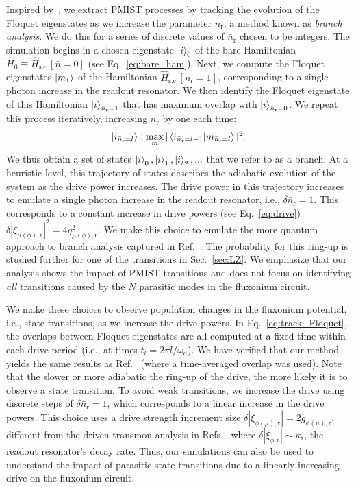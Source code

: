 \documentclass[%
reprint,
superscriptaddress,
 amsmath,amssymb,
 aps,
 prx,
longbibliography,
floatfix,
]{revtex4-2}
\begin{document}
Inspired by~\cite{dumas2024unified,cohen2023reminiscence}, we extract PMIST processes by tracking the evolution of the Floquet eigenstates as we increase the parameter $\bar{n}_\textrm{r}$, a method known as \emph{branch analysis}. We do this for a series of discrete values of $\bar{n}_\textrm{r}$ chosen to be integers. The simulation begins in a chosen eigenstate $\ket{i}_0$ of the bare Hamiltonian $\hat{H}_0 \equiv \hat{H}_\textrm{s.c.}[\bar{n}=0]$ (see Eq.~\ref{eq:bare_ham}). Next, we compute the Floquet eigenstates $\ket{m_1}$ of the Hamiltonian $\hat{H}_\textrm{s.c.}[\bar{n}_\textrm{r}=1]$, corresponding to a single photon increase in the readout resonator. We then identify the Floquet eigenstate of this Hamiltonian $\ket{i}_{\bar n_\textrm{r}=1}$ that has maximum overlap with $\ket{i}_{\bar n_\textrm{r}=0}$. We repeat this process iteratively, increasing $\bar{n}_\textrm{r}$ by one each time:
\begin{align}
\ket{i_{\bar n_\textrm{r}=l}}:\max_{m}|\braket{i_{\bar n_\textrm{r}=l-1}|{m}_{\bar n_\textrm{r}=l}}|^2.\label{eq:track_Floquet}   
\end{align}
We thus obtain a set of states $\ket{i}_0,\ket{i}_1,\ket{i}_2,...$ that we refer to as a branch. At a heuristic level, this trajectory of states describes the adiabatic evolution of the system as the drive power increases. The drive power in this trajectory increases to emulate a single photon increase in the readout resonator, i.e., $\delta \bar n_\textrm{r}=1$. This corresponds to a constant increase in drive powers (see Eq.~\ref{eq:drive}) $\delta |\xi_{\mu (\phi),\textrm{r}}|^2=4g_{\mu (\phi),\textrm{r}}^2$. We make this choice to emulate the more quantum approach to branch analysis captured in Ref.~\cite{shillito2022dynamics,dumas2024unified}. The probability for this ring-up is studied further for one of the transitions in Sec.~\ref{sec:LZ}. We emphasize that our analysis shows the impact of PMIST transitions and does not focus on identifying \emph{all} transitions caused by the $N$ parasitic modes in the fluxonium circuit.


We make these choices to observe population changes in the fluxonium potential, i.e., state transitions, as we increase the drive powers. In Eq.~\ref{eq:track_Floquet}, the overlaps between Floquet eigenstates are all computed at a fixed time within each drive period (i.e., at times $t_l = 2 \pi l/ \omega_\textrm{d}$). We have verified that our method yields the same results as Ref.~\cite{dumas2024unified} (where a time-averaged overlap was used). Note that the slower or more adiabatic the ring-up of the drive, the more likely it is to observe a state transition. To avoid weak transitions, we increase the drive using discrete steps of $\delta \bar n_\textrm{r}=1$, which corresponds to a linear increase in the drive powers. This choice uses a drive strength increment size $\delta |\xi_{\phi (\mu),\textrm{r}}|= 2g_{\phi(\mu),\textrm{r}}$, different from the driven transmon analysis in Refs.~\cite{dumas2024unified} where $\delta |\xi_{\phi,\textrm{r}}|\sim \kappa_\textrm{r}$, the readout resonator's decay rate. Thus, our simulations can also be used to understand the impact of parasitic state transitions due to a linearly increasing drive on the fluxonium circuit.
\end{document}
